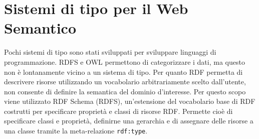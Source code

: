 \section[Sistemi di tipo per il Web Semantico]{Sistemi di tipo per il Web Semantico}
Pochi sistemi di tipo sono stati sviluppati per sviluppare linguaggi di programmazione.
RDFS e OWL permettono di categorizzare i dati, ma questo non è lontanamente vicino a un sistema di tipo.
Per quanto RDF permetta di descrivere risorse utilizzando un vocabolario arbitrariamente scelto dall'utente, non consente di definire la semantica del dominio d'interesse. Per questo scopo viene utilizzato RDF Schema (RDFS), un'estensione del vocabolario base di RDF costrutti per specificare proprietà e classi di risorse RDF. Permette cioè di specificare classi e proprietà, definirne una gerarchia e di assegnare delle risorse a una classe tramite la meta-relazione \verb|rdf:type|.